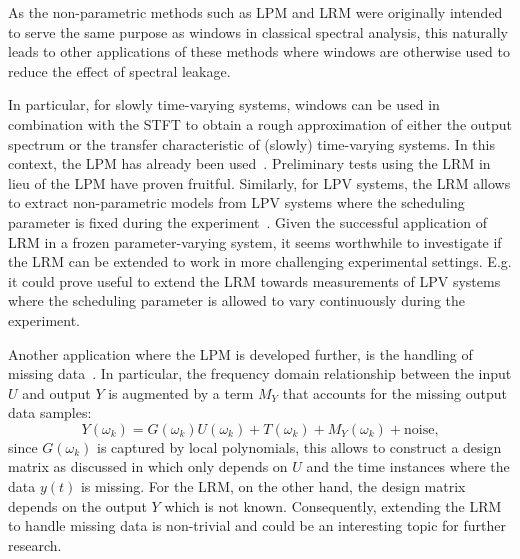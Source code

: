     As the non-parametric methods such as \gls{LPM} and \gls{LRM} were originally intended to serve the same purpose as windows in classical spectral analysis, this naturally leads to other applications of these methods where windows are otherwise used to reduce the effect of spectral leakage.

    In particular, for slowly time-varying systems, windows can be used in combination with the \gls{STFT} to obtain a rough approximation of either the output spectrum or the transfer characteristic of (slowly) time-varying systems.
    In this context, the \gls{LPM} has already been used~\citep{Lataire2012}.
    Preliminary tests using the \gls{LRM} in lieu of the \gls{LPM} have proven fruitful.
    Similarly, for \gls{LPV} systems, the \gls{LRM} allows to extract non-parametric models from \gls{LPV} systems where the scheduling parameter is fixed during the experiment~\citep{vanderMaas2015CDC}.
    Given the successful application of \gls{LRM} in a frozen parameter-varying system, it seems worthwhile to investigate if the \gls{LRM} can be extended to work in more challenging experimental settings.
    E.g. it could prove useful to extend the \gls{LRM} towards measurements of \gls{LPV} systems where the scheduling parameter is allowed to vary continuously during the experiment.

    Another application where the \gls{LPM} is developed further, is the handling of missing data~\citep{Ugryumova2015}.
    In particular, the frequency domain relationship between the input $U$ and output $Y$ is augmented by a term $M_Y$ that accounts for the missing output data samples:
    \begin{equation}
      Y(\omega_k) = G(\omega_k) U(\omega_k) + T(\omega_k) + M_Y(\omega_k) + \mathrm{noise}\text{,}
    \end{equation}
    since $G(\omega_k)$ is captured by local polynomials, this allows to construct a design matrix as discussed in  which only depends on $U$ and the time instances where the data $y(t)$ is missing.
    For the \gls{LRM}, on the other hand, the design matrix depends on the output $Y$ which is not known.
    Consequently, extending the \gls{LRM} to handle missing data is non-trivial and could be an interesting topic for further research.

